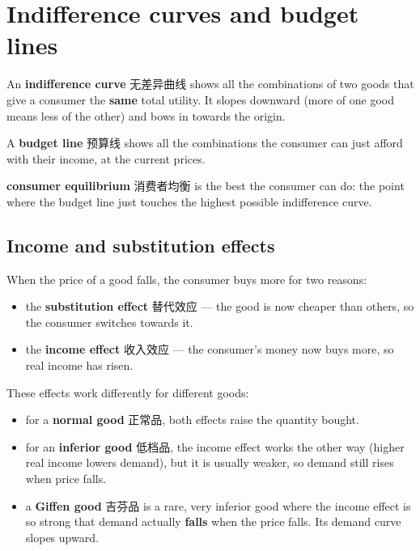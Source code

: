 \documentclass[11pt]{article}
\begin{document}
\section*{Indifference curves and budget lines}

An \textbf{indifference curve} 无差异曲线 shows all the combinations of two goods that give a consumer the \textbf{same} total utility. It slopes downward (more of one good means less of the other) and bows in towards the origin.

A \textbf{budget line} 预算线 shows all the combinations the consumer can just afford with their income, at the current prices.

\textbf{consumer equilibrium} 消费者均衡 is the best the consumer can do: the point where the budget line just touches the highest possible indifference curve.

\subsection*{Income and substitution effects}

When the price of a good falls, the consumer buys more for two reasons:

\begin{itemize}
\item the \textbf{substitution effect} 替代效应 — the good is now cheaper than others, so the consumer switches towards it.

\item the \textbf{income effect} 收入效应 — the consumer's money now buys more, so real income has risen.

\end{itemize}

These effects work differently for different goods:

\begin{itemize}
\item for a \textbf{normal good} 正常品, both effects raise the quantity bought.

\item for an \textbf{inferior good} 低档品, the income effect works the other way (higher real income lowers demand), but it is usually weaker, so demand still rises when price falls.

\item a \textbf{Giffen good} 吉芬品 is a rare, very inferior good where the income effect is so strong that demand actually \textbf{falls} when the price falls. Its demand curve slopes upward.

\end{itemize}
\end{document}
